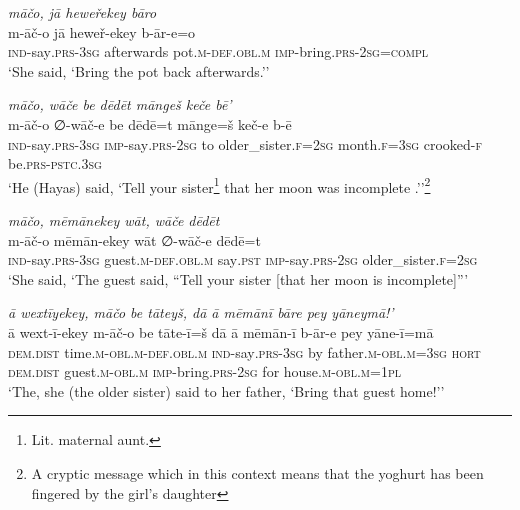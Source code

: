 \ea \label{ŽH.44}
\textit{māčo, jā heweřekey bāro} \\ 
\gll m-āč-o jā heweř-ekey b-ār-e=o \\ 
 \textsc{ind-}say\textsc{.prs}\textsc{-3sg} afterwards pot\textsc{.m}\textsc{-def}\textsc{.obl}\textsc{.m} \textsc{imp-}bring\textsc{.prs}-\textsc{2sg}\textsc{=compl} \\ 
\glt `She said, ‘Bring the pot back afterwards.’'
\z 
 
\ea \label{ŽH.45}
\textit{māčo, wāče be dēdēt māngeš keče bē’} \\ 
\gll m-āč-o ∅-wāč-e be dēdē=t mānge=š keč-e b-ē \\ 
 \textsc{ind-}say\textsc{.prs}\textsc{-3sg} \textsc{imp-}say\textsc{.prs-}\textsc{2sg} to older\_sister\textsc{\textsc{.f}}\textsc{=\textsc{2sg}} month\textsc{\textsc{.f}}\textsc{=3sg} crooked\textsc{-f} be\textsc{.prs}\textsc{-pstc}\textsc{.3sg} \\ 
\glt `He (Hayas) said, ‘Tell your sister\footnote{Lit. maternal aunt.} that her moon was incomplete .’'\footnote{A cryptic message which in this context means that the yoghurt has been fingered by the girl’s daughter}
\z 
 
\ea \label{ŽH.47}
\textit{māčo, mēmānekey wāt, wāče dēdēt} \\ 
\gll m-āč-o mēmān-ekey wāt ∅-wāč-e dēdē=t \\ 
 \textsc{ind-}say\textsc{.prs}\textsc{-3sg} guest\textsc{.m}\textsc{-def}\textsc{.obl}\textsc{.m} say\textsc{.pst} \textsc{imp-}say\textsc{.prs-}\textsc{2sg} older\_sister\textsc{\textsc{.f}}\textsc{=\textsc{2sg}} \\ 
\glt `She said, ‘The guest said, “Tell your sister [that her moon is incomplete]”'
\z 
 
\ea \label{ŽH.50}
\textit{ā wextīyekey, māčo be tāteyš, dā ā mēmānī bāre pey yāneymā!’} \\ 
\gll ā wext-ī-ekey m-āč-o be tāte-ī=š dā ā mēmān-ī b-ār-e pey yāne-ī=mā \\ 
 \textsc{dem.dist} time\textsc{.m}\textsc{-obl}\textsc{.m}\textsc{-def}\textsc{.obl}\textsc{.m} \textsc{ind-}say\textsc{.prs}\textsc{-3sg} by father\textsc{.m}\textsc{-obl}\textsc{.m}\textsc{=3sg} \textsc{hort} \textsc{dem.dist} guest\textsc{.m}\textsc{-obl}\textsc{.m} \textsc{imp-}bring\textsc{.prs}-\textsc{2sg} for house\textsc{.m}\textsc{-obl}\textsc{.m}\textsc{=1pl} \\ 
\glt `The, she (the older sister) said to her father, ‘Bring that guest home!’'
\z 
 
